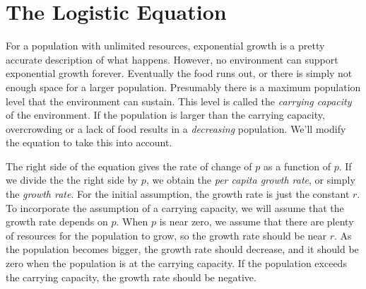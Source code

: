 \documentclass[reqno]{immbook}
\begin{document}
\section{The Logistic Equation}

For a population with unlimited resources, exponential growth
is a pretty accurate description of what happens.
However, no environment can support exponential growth forever.
Eventually the food runs out, or there is simply not enough space
for a larger population.
Presumably there is a maximum population level that the environment
can sustain.  This level is called the
\emph{carrying capacity}
of the environment. If the population is larger than the
carrying capacity, overcrowding or a lack of food results in a
\emph{decreasing} population.
We'll modify the equation to take this into account.

The right side of the equation gives the rate of change of $p$ as a function
of $p$.
If we divide the the right side by $p$, we obtain the
\emph{per capita growth rate},
or simply the \emph{growth rate}.
For the initial assumption,
the growth rate  is just the constant $r$.
To incorporate the assumption of a carrying capacity, we will assume that the
growth rate depends on $p$.  When $p$ is near zero, we assume that there
are plenty of resources for the population to grow, so the growth rate should be
near $r$.  As the population becomes bigger, the growth rate should decrease,
and it should be zero when the population is at the carrying capacity.
If the population exceeds the carrying capacity, the growth rate should
be negative.
\end{document}
